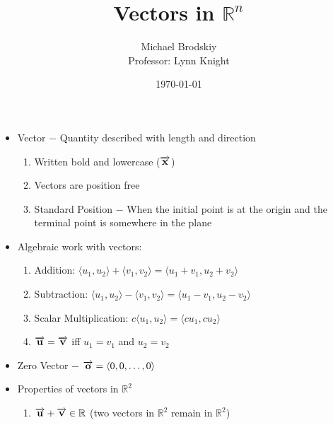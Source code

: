 \documentclass[12pt]{article}
\title{Vectors in $\mathbb{R}^n$}
\date{\today}
\author{Michael Brodskiy\\ \small Professor: Lynn Knight}
\begin{document}
\maketitle

\begin{itemize}

  \item Vector $-$ Quantity described with length and direction

    \begin{enumerate}

      \item Written bold and lowercase ($\overrightarrow{\bold{x}}$)

      \item Vectors are position free

      \item Standard Position $-$ When the initial point is at the origin and the terminal point is somewhere in the plane

    \end{enumerate}

  \item Algebraic work with vectors:

    \begin{enumerate}

      \item Addition: $\langle u_1, u_2 \rangle + \langle v_1, v_2 \rangle= \langle u_1+v_1, u_2+v_2 \rangle$

      \item Subtraction: $\langle u_1, u_2 \rangle - \langle v_1, v_2 \rangle= \langle u_1-v_1, u_2-v_2 \rangle$

      \item Scalar Multiplication: $c\langle u_1, u_2 \rangle = \langle cu_1, cu_2 \rangle$

      \item $\overrightarrow{\bold{u}}=\overrightarrow{\bold{v}}$ iff $u_1=v_1$ and $u_2=v_2$

    \end{enumerate}

  \item Zero Vector $-$ $\overrightarrow{\bold{o}}=\langle 0, 0,\dots, 0\rangle$

  \item Properties of vectors in $\mathbb{R}^2$

    \begin{enumerate}

      \item $\overrightarrow{\bold{u}} + \overrightarrow{\bold{v}} \in \mathbb{R}$ (two vectors in $\mathbb{R}^2$ remain in $\mathbb{R}^2$)


\end{enumerate}
\end{itemize}
\end{document}
